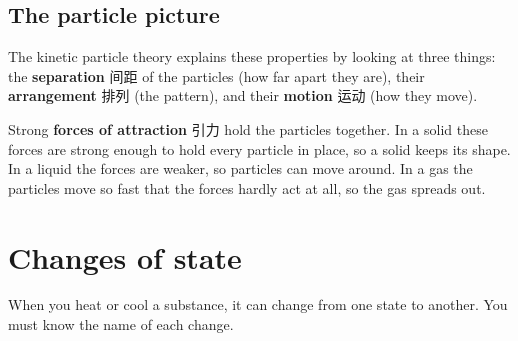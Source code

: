 \documentclass[11pt]{article}
\begin{document}
\subsection*{The particle picture}

The kinetic particle theory explains these properties by looking at three things: the \textbf{separation} 间距 of the particles (how far apart they are), their \textbf{arrangement} 排列 (the pattern), and their \textbf{motion} 运动 (how they move).

\begin{center}
\end{center}

Strong \textbf{forces of attraction} 引力 hold the particles together. In a solid these forces are strong enough to hold every particle in place, so a solid keeps its shape. In a liquid the forces are weaker, so particles can move around. In a gas the particles move so fast that the forces hardly act at all, so the gas spreads out.

\section*{Changes of state}

When you heat or cool a substance, it can change from one state to another. You must know the name of each change.

\begin{center}
\end{center}
\end{document}

